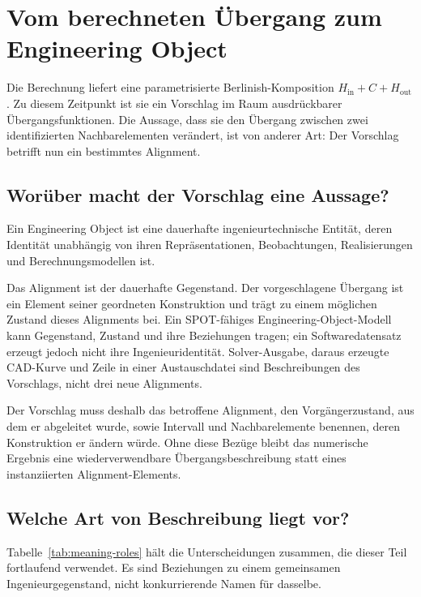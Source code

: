 
\chapter{Vom berechneten Übergang zum Engineering Object}
\label{chap:engineering-objects}

Die Berechnung liefert eine parametrisierte Berlinish-Komposition
$H_{\mathrm{in}}+C+H_{\mathrm{out}}$. Zu diesem Zeitpunkt ist sie ein Vorschlag
im Raum ausdrückbarer Übergangsfunktionen. Die Aussage, dass sie den Übergang
zwischen zwei identifizierten Nachbarelementen verändert, ist von anderer Art:
Der Vorschlag betrifft nun ein bestimmtes Alignment.

\section{Worüber macht der Vorschlag eine Aussage?}

\begin{definition}
\label{def:engineering-object}
Ein Engineering Object ist eine dauerhafte ingenieurtechnische Entität, deren
Identität unabhängig von ihren Repräsentationen, Beobachtungen, Realisierungen
und Berechnungsmodellen ist.
\end{definition}

Das Alignment ist der dauerhafte Gegenstand. Der vorgeschlagene Übergang ist
ein Element seiner geordneten Konstruktion und trägt zu einem möglichen Zustand
dieses Alignments bei. Ein SPOT-fähiges Engineering-Object-Modell kann
Gegenstand, Zustand und ihre Beziehungen tragen; ein Softwaredatensatz erzeugt
jedoch nicht ihre Ingenieuridentität. Solver-Ausgabe, daraus erzeugte CAD-Kurve
und Zeile in einer Austauschdatei sind Beschreibungen des Vorschlags, nicht drei
neue Alignments.

Der Vorschlag muss deshalb das betroffene Alignment, den Vorgängerzustand, aus
dem er abgeleitet wurde, sowie Intervall und Nachbarelemente benennen, deren
Konstruktion er ändern würde. Ohne diese Bezüge bleibt das numerische Ergebnis
eine wiederverwendbare Übergangsbeschreibung statt eines instanziierten
Alignment-Elements.

\section{Welche Art von Beschreibung liegt vor?}

Tabelle~\ref{tab:meaning-roles} hält die Unterscheidungen zusammen, die dieser
Teil fortlaufend verwendet. Es sind Beziehungen zu einem gemeinsamen
Ingenieurgegenstand, nicht konkurrierende Namen für dasselbe.

